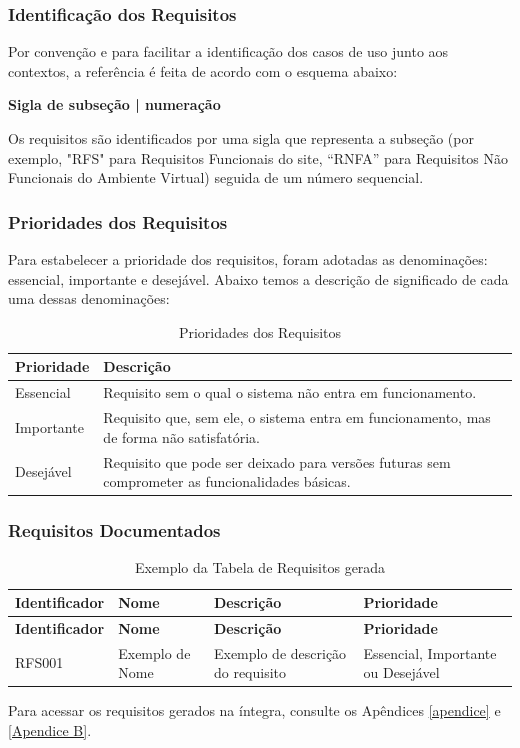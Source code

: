 \subsubsection{Identificação dos Requisitos}
\label{sec:identificacao_requisitos}

Por convenção e para facilitar a identificação dos casos de uso junto aos contextos, a referência é feita de acordo com o esquema abaixo:

\textbf{Sigla de subseção | numeração}

Os requisitos são identificados por uma sigla que representa a subseção (por exemplo, "RFS" para Requisitos Funcionais do site, “RNFA” para Requisitos Não Funcionais do Ambiente Virtual) seguida de um número sequencial.

\subsubsection{Prioridades dos Requisitos}
\label{sec:prioridades_requisitos}

Para estabelecer a prioridade dos requisitos, foram adotadas as denominações: essencial, importante e desejável. Abaixo temos a descrição de significado de cada uma dessas denominações:

\begin{table}[H]
\centering
\caption{Prioridades dos Requisitos}
\label{tab:prioridades_requisitos}
\begin{tabular}{|l|p{10cm}|}
\hline
\textbf{Prioridade} & \textbf{Descrição} \\ \hline
Essencial & Requisito sem o qual o sistema não entra em funcionamento. \\ \hline
Importante & Requisito que, sem ele, o sistema entra em funcionamento, mas de forma não satisfatória. \\ \hline
Desejável & Requisito que pode ser deixado para versões futuras sem comprometer as funcionalidades básicas. \\ \hline
\end{tabular}
\end{table}

\subsubsection{Requisitos Documentados}
\label{sec:requisitos_documentados}
{\small 
\begin{longtable}{|p{2.5cm}|p{4cm}|p{6cm}|p{2cm}|}
\caption{Exemplo da Tabela de Requisitos gerada}
\label{table:exemplo_tabela_requisitos} \\
\hline
\textbf{Identificador} & \textbf{Nome} & \textbf{Descrição} & \textbf{Prioridade} \\
\hline
\endfirsthead
\hline
\textbf{Identificador} & \textbf{Nome} & \textbf{Descrição} & \textbf{Prioridade} \\
\hline
\endhead
RFS001 & Exemplo de Nome & Exemplo de descrição do requisito & Essencial, Importante ou Desejável \\ \hline
\end{longtable}
}
Para acessar os requisitos gerados na íntegra, consulte os Apêndices \ref{apendice} e \ref{Apendice B}.


